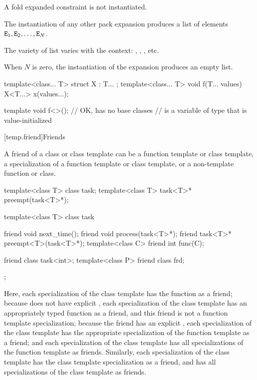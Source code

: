 \pnum
A fold expanded constraint is not instantiated.

\pnum
The instantiation of any other pack expansion
produces a list of elements $\texttt{\protect E}_1, \texttt{\protect E}_2, \dotsc, \texttt{\protect E}_N$.
\begin{note}
The variety of list varies with the context:
,
,
, etc.
\end{note}
When $N$ is zero, the instantiation of the expansion produces an empty list.
\begin{example}
\begin{codeblock}
template<class... T> struct X : T... { };
template<class... T> void f(T... values) {
  X<T...> x(values...);
}

template void f<>();    // OK,  has no base classes
                        //  is a variable of type  that is value-initialized
\end{codeblock}
\end{example}

[temp.friend]{Friends}

\pnum
{}%
A friend of a class or class template can be a function template or
class template, a specialization of a function template or class
template, or a non-template function or class.
\begin{example}
\begin{codeblock}
template<class T> class task;
template<class T> task<T>* preempt(task<T>*);

template<class T> class task {
  friend void next_time();
  friend void process(task<T>*);
  friend task<T>* preempt<T>(task<T>*);
  template<class C> friend int func(C);

  friend class task<int>;
  template<class P> friend class frd;
};
\end{codeblock}

Here,
each specialization of the
class template has the function
as a friend;
because
does not have explicit
,
each specialization of the
class template has an appropriately typed function
as a friend, and this friend is not a function template specialization;
because the friend
has an explicit
,
each specialization of the
class template has the appropriate specialization of the function
template
as a friend;
and each specialization of the
class template has all specializations of the function template
as friends.
Similarly,
each specialization of the
class template has the class template specialization
as a friend, and has all specializations of the class template
as friends.
\end{example}

